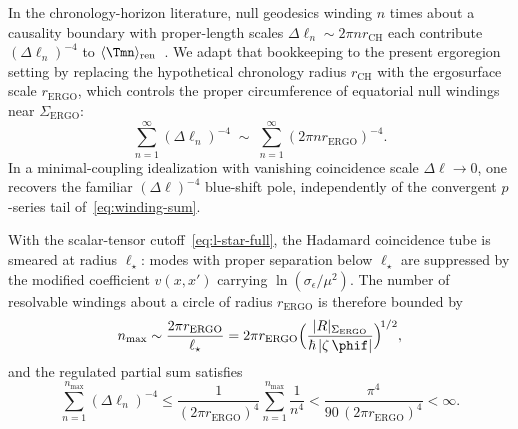 In the chronology-horizon literature, null geodesics winding $n$ times about a
causality boundary with proper-length scales $\Delta\ell_{n}\sim 2\pi n r_{\mathrm{CH}}$
each contribute $(\Delta\ell_{n})^{-4}$ to $\langle\Tmn\rangle_{\mathrm{ren}}$~\cite{KimThorne1991}.
We adapt that bookkeeping to the present ergoregion setting by replacing the
hypothetical chronology radius $r_{\mathrm{CH}}$ with the ergosurface scale
$r_{\mathrm{ERGO}}$, which controls the proper circumference of equatorial
null windings near $\Sigma_{\mathrm{ERGO}}$:
\begin{equation}
\label{eq:winding-sum}
\sum_{n=1}^{\infty}(\Delta\ell_{n})^{-4}
\;\sim\;
\sum_{n=1}^{\infty}(2\pi n r_{\mathrm{ERGO}})^{-4}.
\end{equation}
In a minimal-coupling idealization with vanishing coincidence scale
$\Delta\ell\to 0$, one recovers the familiar $(\Delta\ell)^{-4}$ blue-shift pole,
independently of the convergent $p$-series tail of~\eqref{eq:winding-sum}.

With the scalar-tensor cutoff~\eqref{eq:l-star-full}, the Hadamard
coincidence tube is smeared at radius $\ell_{\star}$: modes with
proper separation below $\ell_{\star}$ are suppressed by the modified
coefficient $v(x,x')$ carrying $\ln(\sigma_{\epsilon}/\mu^{2})$.
The number of resolvable windings about a circle of radius $r_{\mathrm{ERGO}}$
is therefore bounded by
\begin{equation}
\label{eq:n-max}
n_{\max}\sim \frac{2\pi r_{\mathrm{ERGO}}}{\ell_{\star}}
= 2\pi r_{\mathrm{ERGO}}
\Bigl(\frac{|R|_{\Sigma_{\mathrm{ERGO}}}}{\hbar\,|\zeta\,\phif|}\Bigr)^{\!1/2},
\end{equation}
and the regulated partial sum satisfies
\begin{equation}
\label{eq:truncated-sum}
\sum_{n=1}^{n_{\max}}(\Delta\ell_{n})^{-4}
\le \frac{1}{(2\pi r_{\mathrm{ERGO}})^{4}}
\sum_{n=1}^{n_{\max}}\frac{1}{n^{4}}
<\frac{\pi^{4}}{90\,(2\pi r_{\mathrm{ERGO}})^{4}}<\infty.
\end{equation}

